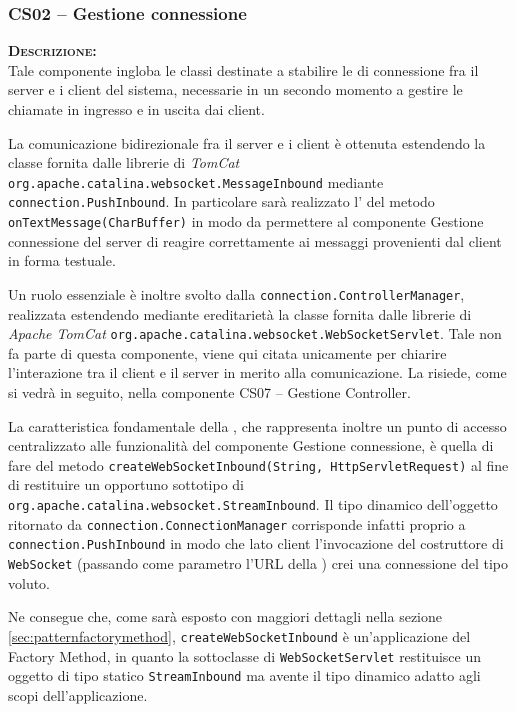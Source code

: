 \subsubsection{CS02 -- Gestione connessione}\label{sec:cs02}
\begin{description}
	\item{\scshape\bfseries Descrizione:}\\
Tale componente ingloba le classi destinate a stabilire le  di connessione fra il server e i client del sistema, necessarie in un secondo momento a gestire le chiamate in ingresso e in uscita dai client.

La comunicazione bidirezionale fra il server e i client è ottenuta estendendo la classe fornita dalle librerie di \textit{TomCat} \texttt{org.apache.catalina.websocket.MessageInbound} mediante \texttt{connection.PushInbound}. In particolare sarà realizzato l' del metodo \texttt{onTextMessage(CharBuffer)} in modo da permettere al componente \textsf{Gestione connessione} del server di reagire correttamente ai messaggi provenienti dal client in forma testuale.

Un ruolo essenziale è inoltre svolto dalla  \texttt{connection.ControllerManager}, realizzata estendendo mediante ereditarietà la classe fornita dalle librerie di \textit{Apache TomCat} \texttt{org.apache.catalina.websocket.WebSocketServlet}. Tale  non fa parte di questa componente, viene qui citata unicamente per chiarire l'interazione tra il client e il server in merito alla comunicazione. La  risiede, come si vedrà in seguito, nella componente \textsf{CS07 -- Gestione Controller}.

La caratteristica fondamentale della , che rappresenta inoltre un punto di accesso centralizzato alle funzionalità del componente \textsf{Gestione connessione}, è quella di fare  del metodo \texttt{createWebSocketInbound(String, HttpServletRequest)} al fine di restituire un opportuno sottotipo di \texttt{org.apache.catalina.websocket.StreamInbound}. Il tipo dinamico dell'oggetto ritornato da \texttt{connection.ConnectionManager} corrisponde infatti proprio a \texttt{connection.PushInbound} in modo che lato client l'invocazione del costruttore di \texttt{WebSocket} (passando come parametro l'URL della ) crei una connessione del tipo voluto.

Ne consegue che, come sarà esposto con maggiori dettagli nella sezione \vref{sec:patternfactorymethod}, \texttt{createWebSocketInbound} è un'applicazione del  Factory Method, in quanto la sottoclasse di \texttt{WebSocketServlet} restituisce un oggetto di tipo statico \texttt{StreamInbound} ma avente il tipo dinamico adatto agli scopi dell'applicazione.


\end{description}
